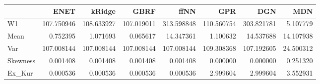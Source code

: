 \begin{tabular}{lrrrrrrr}
\toprule
{} &        ENET &      kRidge &        GBRF &        ffNN &         GPR &         DGN &        MDN \\
\midrule
W1       &  107.750946 &  108.633927 &  107.019011 &  313.598848 &  110.560754 &  303.821781 &   5.107779 \\
Mean     &    0.752395 &    1.071693 &    0.065617 &   14.347361 &    1.100632 &   14.537688 &  14.107938 \\
Var      &  107.008144 &  107.008144 &  107.008144 &  107.008144 &  109.308368 &  107.192605 &  24.500312 \\
Skewness &    0.001408 &    0.001408 &    0.001408 &    0.001408 &    0.000000 &    0.000000 &   0.251320 \\
Ex\_Kur   &    0.000536 &    0.000536 &    0.000536 &    0.000536 &    2.999604 &    2.999604 &   3.552931 \\
\bottomrule
\end{tabular}
